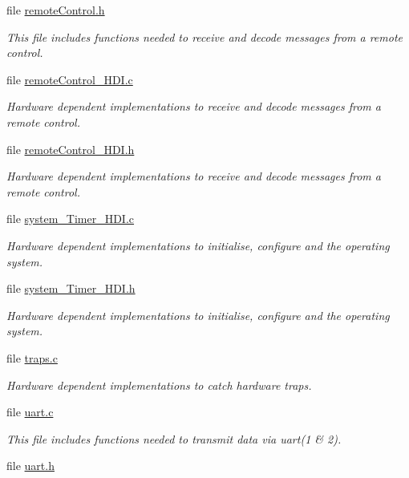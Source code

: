 \begin{DoxyCompactItemize}
file \hyperlink{remoteControl_8h}{remote\+Control.\+h}
\begin{DoxyCompactList}\small\item\em This file includes functions needed to receive and decode messages from a remote control. \end{DoxyCompactList}\item 
file \hyperlink{remoteControl__HDI_8c}{remote\+Control\+\_\+\+H\+D\+I.\+c}
\begin{DoxyCompactList}\small\item\em Hardware dependent implementations to receive and decode messages from a remote control. \end{DoxyCompactList}\item 
file \hyperlink{remoteControl__HDI_8h}{remote\+Control\+\_\+\+H\+D\+I.\+h}
\begin{DoxyCompactList}\small\item\em Hardware dependent implementations to receive and decode messages from a remote control. \end{DoxyCompactList}\item 
file \hyperlink{system__Timer__HDI_8c}{system\+\_\+\+Timer\+\_\+\+H\+D\+I.\+c}
\begin{DoxyCompactList}\small\item\em Hardware dependent implementations to initialise, configure and the operating system. \end{DoxyCompactList}\item 
file \hyperlink{system__Timer__HDI_8h}{system\+\_\+\+Timer\+\_\+\+H\+D\+I.\+h}
\begin{DoxyCompactList}\small\item\em Hardware dependent implementations to initialise, configure and the operating system. \end{DoxyCompactList}\item 
file \hyperlink{traps_8c}{traps.\+c}
\begin{DoxyCompactList}\small\item\em Hardware dependent implementations to catch hardware traps. \end{DoxyCompactList}\item 
file \hyperlink{uart_8c}{uart.\+c}
\begin{DoxyCompactList}\small\item\em This file includes functions needed to transmit data via uart(1 \& 2). \end{DoxyCompactList}\item 
file \hyperlink{uart_8h}{uart.\+h}

\end{DoxyCompactItemize}
